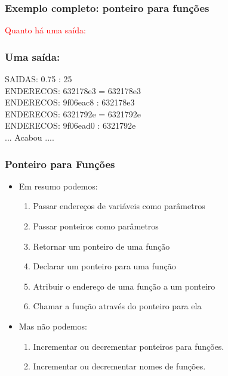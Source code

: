 \begin{frame}[allowframebreaks=0.9, c]

\frametitle{Exemplo completo: ponteiro para funções}


\textcolor{red}{Quanto há uma saída:}
\end{frame}

\begin{frame}[fragile, c]

\frametitle{Uma saída:}
\begin{block}{}
\begin{small}
SAIDAS:   0.75 : 25\\
ENDERECOS: 632178e3 = 632178e3\\ 
ENDERECOS: 9f06eac8 : 632178e3\\ 
ENDERECOS: 6321792e = 6321792e\\ 
ENDERECOS: 9f06ead0 : 6321792e\\ 
 ... Acabou ....\\
\end{small}
\end{block}
\end{frame}







\begin{frame}[fragile,c]
\frametitle{Ponteiro para Funções}
\begin{itemize}
  \item Em resumo podemos:  
    \begin{enumerate}
      \item Passar endereços de variáveis como parâmetros
      \item Passar ponteiros como parâmetros
      \item Retornar um ponteiro de uma função

      \item Declarar um ponteiro para uma função

      \item Atribuir o endereço de uma função a um ponteiro

      \item Chamar a função através do ponteiro para ela

    \end{enumerate}

  \item Mas não podemos:  

    \begin{enumerate}
      \item Incrementar ou decrementar ponteiros para funções.
      \item Incrementar ou decrementar nomes de funções.
    \end{enumerate} 

\end{itemize}

\end{frame}

